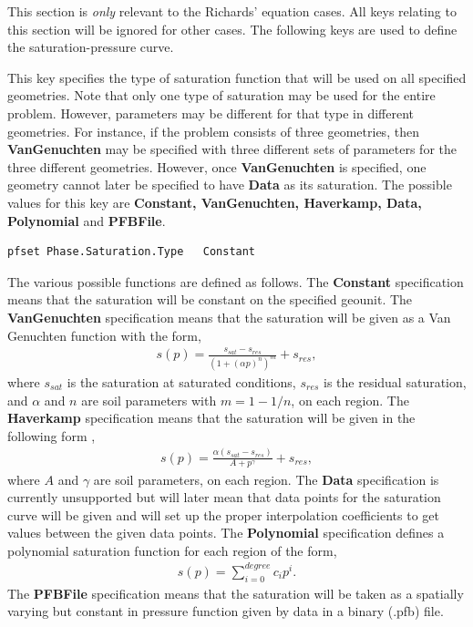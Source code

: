 This section is {\em only} relevant to the Richards' equation cases.  All keys
relating to this section will be ignored for other cases.
The following keys are used to define the saturation-pressure curve.

{
This key specifies the type of saturation function that will be used
on all specified geometries.  Note that only one type of saturation
may be used for the entire problem.  However, parameters may be different for
that type in different geometries.  For instance, if the problem consists of
three geometries, then {\bf VanGenuchten} may be specified with three different
sets of parameters for the three different geometries.  However, once {\bf
VanGenuchten} is specified, one geometry cannot later be specified to have {\bf
Data} as its saturation.  The possible values for this key
are {\bf Constant, VanGenuchten, Haverkamp, Data, Polynomial} and
{\bf PFBFile}.
}
\begin{display}\begin{verbatim}
pfset Phase.Saturation.Type   Constant
\end{verbatim}\end{display}

The various possible functions are defined as follows.
The {\bf Constant} specification means that the saturation will be
constant on the specified geounit.  The {\bf VanGenuchten} specification means
that the saturation will be given as a Van Genuchten function
\cite{VanGenuchten80} with the form,
\begin{eqnarray}
s(p) = \frac{s_{sat} - s_{res}}{(1 + (\alpha p)^n)^m} + s_{res},
\end{eqnarray}
where $s_{sat}$ is the saturation at saturated conditions,
$s_{res}$ is the residual saturation, and
$\alpha$ and $n$ are soil parameters with $m = 1 - 1/n$, on each region.
The {\bf Haverkamp} specification means that the saturation will be
given in the following form \cite{Haverkamp-Vauclin81},
\begin{eqnarray}
s(p) = \frac{\alpha(s_{sat} - s_{res})}{A + p^{\gamma}} + s_{res},
\end{eqnarray}
where $A$ and $\gamma$ are soil parameters, on each region.
The {\bf Data} specification is currently unsupported but will later mean that
data points for the saturation curve will be given and \parflow{}
will set up the proper interpolation coefficients to get values between the
given data points.
The {\bf Polynomial} specification
defines a polynomial saturation function for each region of the form,
\begin{eqnarray}
s(p) = \sum_{i=0}^{degree} c_ip^i.
\end{eqnarray}
The {\bf PFBFile} specification means that the saturation will be taken as a
spatially varying but constant in pressure function given by data in a
\parflow{} binary (.pfb) file.

